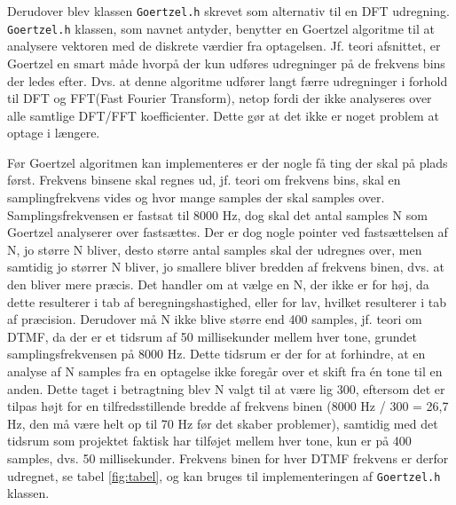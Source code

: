 Derudover blev klassen \texttt{Goertzel.h} skrevet som alternativ til en DFT udregning.
\newline
\texttt{Goertzel.h} klassen, som navnet antyder, benytter en Goertzel algoritme til at analysere vektoren med de diskrete værdier fra optagelsen. Jf. teori afsnittet, er Goertzel en smart måde hvorpå der kun udføres udregninger på de frekvens bins der ledes efter.
\newline
Dvs. at denne algoritme udfører langt færre udregninger i forhold til DFT og FFT(Fast Fourier Transform), netop fordi der ikke analyseres over alle samtlige DFT/FFT koefficienter. Dette gør at det ikke er noget problem at optage i længere.  
\hfill \break

Før Goertzel algoritmen kan implementeres er der nogle få ting der skal på plads først. Frekvens binsene skal regnes ud, jf. teori om frekvens bins, skal en samplingfrekvens vides og hvor mange samples der skal samples over. Samplingsfrekvensen er fastsat til 8000 Hz, dog skal det antal samples N som Goertzel analyserer over fastsættes. Der er dog nogle pointer ved fastsættelsen af N, jo større N bliver, desto større antal samples skal der udregnes over, men samtidig jo størrer N bliver, jo smallere bliver bredden af frekvens binen, dvs. at den bliver mere præcis. Det handler om at vælge en N, der ikke er for høj, da dette resulterer i tab af beregningshastighed, eller for lav, hvilket resulterer i tab af præcision.
\newline
Derudover må N ikke blive større end 400 samples, jf. teori om DTMF, da der er et tidsrum af 50 millisekunder mellem hver tone, grundet samplingsfrekvensen på 8000 Hz. Dette tidsrum er der for at forhindre, at en analyse af N samples fra en optagelse ikke foregår over et skift fra én tone til en anden.
\newline
Dette taget i betragtning blev N valgt til at være lig 300, eftersom det er tilpas højt for en tilfredsstillende bredde af frekvens binen (8000 Hz / 300 = 26,7 Hz, den må være helt op til 70 Hz før det skaber problemer), samtidig med det tidsrum som projektet faktisk har tilføjet mellem hver tone, kun er på 400 samples, dvs. 50 millisekunder.
\newline
Frekvens binen for hver DTMF frekvens er derfor udregnet, se tabel \ref{fig:tabel}, og kan bruges til implementeringen af \texttt{Goertzel.h} klassen.
